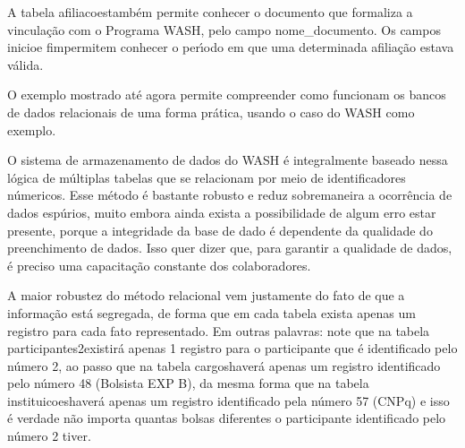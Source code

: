 \documentclass[
12pt,		%
openright,	%
twoside,  %
a4paper,			%
chapter=TITLE,		%
english,			%
french,				%
spanish,			%
brazil				%
]{USPSC-classe/USPSC}
\begin{document}
A tabela \textquotedbl afiliacoes\textquotedbl  tamb\'em permite conhecer o documento que formaliza a vincula\c{c}\~ao com o Programa WASH, pelo campo nome\_documento. Os campos \textquotedbl inicio\textquotedbl  e \textquotedbl fim\textquotedbl  permitem conhecer o per\'{\i}odo em que uma determinada afilia\c{c}\~ao estava v\'alida.

















O exemplo mostrado at\'e agora permite compreender como funcionam os bancos de dados relacionais de uma forma pr\'atica, usando o caso do WASH como exemplo.

















O sistema de armazenamento de dados do WASH \'e integralmente baseado nessa l\'ogica de m\'ultiplas tabelas que se relacionam por meio de identificadores n\'umericos. Esse m\'etodo \'e bastante robusto e reduz sobremaneira a ocorr\^encia de dados esp\'urios, muito embora ainda exista a possibilidade de algum erro estar presente, porque a integridade da base de dado \'e dependente da qualidade do preenchimento de dados. Isso quer dizer que, para garantir a qualidade de dados, \'e preciso uma capacita\c{c}\~ao constante dos colaboradores.

















A maior robustez do m\'etodo relacional vem justamente do fato de que a informa\c{c}\~ao est\'a segregada, de forma que em cada tabela exista apenas um registro para cada fato representado. Em outras palavras: note que na tabela \textquotedbl participantes2\textquotedbl  existir\'a apenas 1 registro para o participante que \'e identificado pelo n\'umero 2, ao passo que na tabela \textquotedbl cargos\textquotedbl  haver\'a apenas um registro identificado pelo n\'umero 48 (Bolsista EXP B), da mesma forma que na tabela \textquotedbl instituicoes\textquotedbl  haver\'a apenas um registro identificado pela n\'umero 57 (CNPq) e isso \'e verdade n\~ao importa quantas bolsas diferentes o participante identificado pelo n\'umero 2 tiver.
\end{document}
